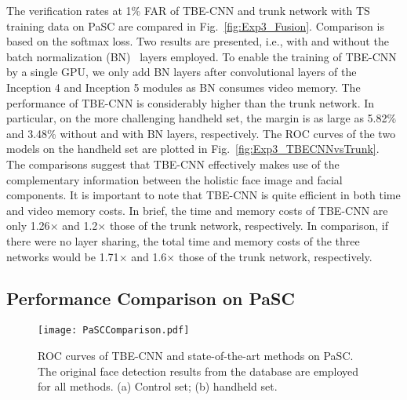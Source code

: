 \documentclass[10pt,journal,cspaper,compsoc]{IEEEtran}
\begin{document}
The verification rates at 1\% FAR of TBE-CNN and trunk network with TS training data on PaSC are compared in Fig.~\ref{fig:Exp3_Fusion}.
Comparison is based on the softmax loss. Two results are presented, i.e., with and without the batch normalization (BN)~\cite{ioffe2015batch} layers employed.
To enable the training of TBE-CNN by a single GPU, we only add BN layers after convolutional layers of the Inception 4 and Inception 5 modules as BN consumes video memory.
The performance of TBE-CNN is considerably higher than the trunk network.
In particular, on the more challenging handheld set, the margin is as large as 5.82\% and 3.48\% without and with BN layers, respectively.
The ROC curves of the two models on the handheld set are plotted in Fig.~\ref{fig:Exp3_TBECNNvsTrunk}.
The comparisons suggest that TBE-CNN effectively makes use of the complementary information between the holistic face image and facial components.
It is important to note that TBE-CNN is quite efficient in both time and video memory costs.
In brief, the time and memory costs of TBE-CNN are only 1.26$\times$ and 1.2$\times$ those of the trunk network, respectively.
In comparison, if there were no layer sharing, the total time and memory costs of the three networks would be 1.71$\times$ and 1.6$\times$ those of the trunk network, respectively.


\subsection{Performance Comparison on PaSC}
\begin{figure}
\centering
\texttt{[image: PaSCComparison.pdf]}
\caption{ROC curves of TBE-CNN and state-of-the-art methods on PaSC.
The original face detection results from the database are employed for all methods.
(a) Control set; (b) handheld set.
}
\label{fig:PaSCComparison}
\end{figure}
\end{document}
